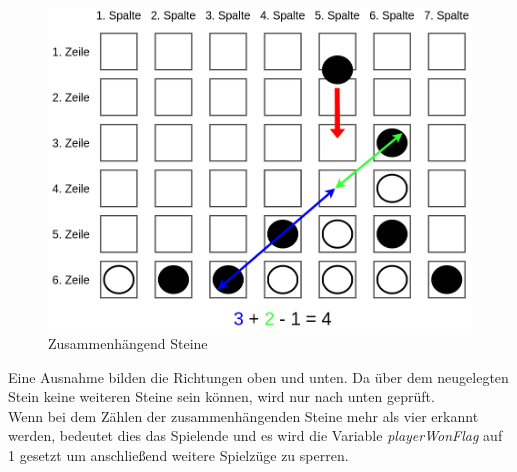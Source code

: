         \begin{figure}[H]
            \centering
            \includegraphics[scale=0.3]{img/gewinnbedingung.png}    
            \caption{Zusammenhängend Steine}
        \end{figure}

        Eine Ausnahme bilden die Richtungen oben und unten.
        Da über dem neugelegten Stein keine weiteren Steine sein können, wird nur nach unten geprüft.
        \\
        Wenn bei dem Zählen der zusammenhängenden Steine mehr als vier erkannt werden,
        bedeutet dies das Spielende und es wird die Variable \textit{playerWonFlag} auf 1 gesetzt um anschließend weitere Spielzüge zu sperren.

      
